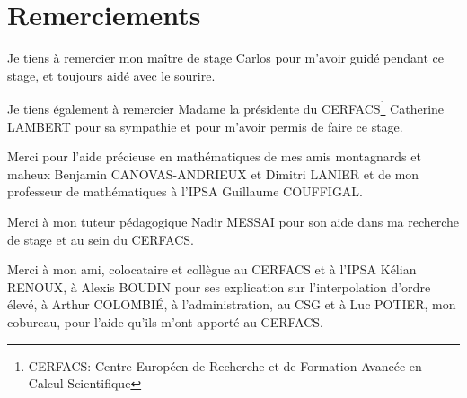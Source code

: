 \chapter*{Remerciements}

Je tiens à remercier mon maître de stage Carlos pour m'avoir guidé pendant
ce stage, et toujours aidé avec le sourire.

Je tiens également à remercier Madame la présidente du
CERFACS\footnote{CERFACS: Centre Européen de Recherche et de Formation Avancée en Calcul Scientifique} Catherine LAMBERT pour sa sympathie et pour m'avoir permis de faire ce stage.

Merci pour l'aide précieuse en mathématiques de mes amis montagnards et maheux Benjamin
CANOVAS-ANDRIEUX et Dimitri LANIER et de mon professeur de mathématiques à l'IPSA Guillaume COUFFIGAL.

Merci à mon tuteur pédagogique Nadir MESSAI pour son aide dans ma recherche de stage et au sein du CERFACS.

Merci à mon ami, colocataire et collègue au CERFACS et à l'IPSA Kélian RENOUX, à Alexis BOUDIN pour ses explication sur l'interpolation d'ordre élevé, à Arthur COLOMBIÉ, à l'administration, au CSG et à Luc POTIER, mon
cobureau, pour l'aide qu'ils m'ont apporté au CERFACS.

